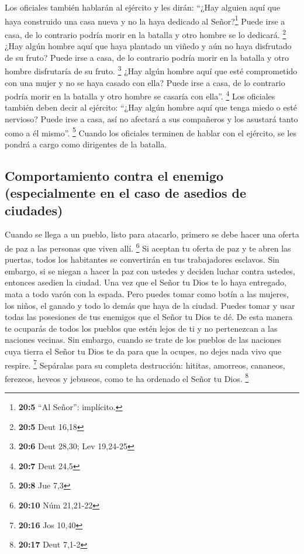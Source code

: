  Los oficiales también hablarán al ejército y les dirán:
``¿Hay alguien aquí que haya construido una casa nueva y no la haya
dedicado al Señor?\footnote{\textbf{20:5} ``Al Señor'': implícito.}
Puede irse a casa, de lo contrario podría morir en la batalla y otro
hombre se lo dedicará. \footnote{\textbf{20:5} Deut 16,18}
 ¿Hay algún hombre aquí que haya plantado un viñedo y aún
no haya disfrutado de su fruto? Puede irse a casa, de lo contrario
podría morir en la batalla y otro hombre disfrutaría de su fruto.
\footnote{\textbf{20:6} Deut 28,30; Lev 19,24-25}  ¿Hay
algún hombre aquí que esté comprometido con una mujer y no se haya
casado con ella? Puede irse a casa, de lo contrario podría morir en la
batalla y otro hombre se casaría con ella''. \footnote{\textbf{20:7}
  Deut 24,5}  Los oficiales también deben decir al
ejército: ``¿Hay algún hombre aquí que tenga miedo o esté nervioso?
Puede irse a casa, así no afectará a sus compañeros y los asustará tanto
como a él mismo''. \footnote{\textbf{20:8} Jue 7,3} 
Cuando los oficiales terminen de hablar con el ejército, se les pondrá a
cargo como dirigentes de la batalla.

\hypertarget{comportamiento-contra-el-enemigo-especialmente-en-el-caso-de-asedios-de-ciudades}{%
\subsection{Comportamiento contra el enemigo (especialmente en el caso
de asedios de
ciudades)}\label{comportamiento-contra-el-enemigo-especialmente-en-el-caso-de-asedios-de-ciudades}}

 Cuando se llega a un pueblo, listo para atacarlo,
primero se debe hacer una oferta de paz a las personas que viven allí.
\footnote{\textbf{20:10} Núm 21,21-22}  Si aceptan tu
oferta de paz y te abren las puertas, todos los habitantes se
convertirán en tus trabajadores esclavos.  Sin embargo,
si se niegan a hacer la paz con ustedes y deciden luchar contra ustedes,
entonces asedien la ciudad.  Una vez que el Señor tu Dios
te lo haya entregado, mata a todo varón con la espada. 
Pero puedes tomar como botín a las mujeres, los niños, el ganado y todo
lo demás que haya de la ciudad. Puedes tomar y usar todas las posesiones
de tus enemigos que el Señor tu Dios te dé.  De esta
manera te ocuparás de todos los pueblos que estén lejos de ti y no
pertenezcan a las naciones vecinas.  Sin embargo, cuando
se trate de los pueblos de las naciones cuya tierra el Señor tu Dios te
da para que la ocupes, no dejes nada vivo que respire. \footnote{\textbf{20:16}
  Jos 10,40}  Sepáralas para su completa destrucción:
hititas, amorreos, cananeos, ferezeos, heveos y jebuseos, como te ha
ordenado el Señor tu Dios. \footnote{\textbf{20:17} Deut 7,1-2}

